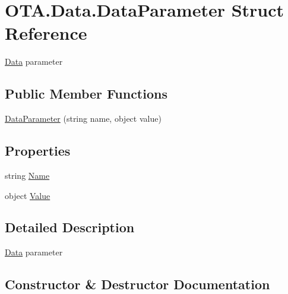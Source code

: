 \hypertarget{struct_o_t_a_1_1_data_1_1_data_parameter}{}\section{O\+T\+A.\+Data.\+Data\+Parameter Struct Reference}
\label{struct_o_t_a_1_1_data_1_1_data_parameter}


\hyperlink{namespace_o_t_a_1_1_data}{Data} parameter  


\subsection*{Public Member Functions}
\begin{DoxyCompactItemize}
\item 
\hyperlink{struct_o_t_a_1_1_data_1_1_data_parameter_a1b0f132c55b702a56cd47b9c86a305c0}{Data\+Parameter} (string name, object value)
\end{DoxyCompactItemize}
\subsection*{Properties}
\begin{DoxyCompactItemize}
\item 
string \hyperlink{struct_o_t_a_1_1_data_1_1_data_parameter_a54b172d99ebc107580a316120569a7b7}{Name}
\item 
object \hyperlink{struct_o_t_a_1_1_data_1_1_data_parameter_a864fb3ccf1d9c3916b2e783eb2eef8ce}{Value}
\end{DoxyCompactItemize}


\subsection{Detailed Description}
\hyperlink{namespace_o_t_a_1_1_data}{Data} parameter 



\subsection{Constructor \& Destructor Documentation}
\hypertarget{struct_o_t_a_1_1_data_1_1_data_parameter_a1b0f132c55b702a56cd47b9c86a305c0}{}

